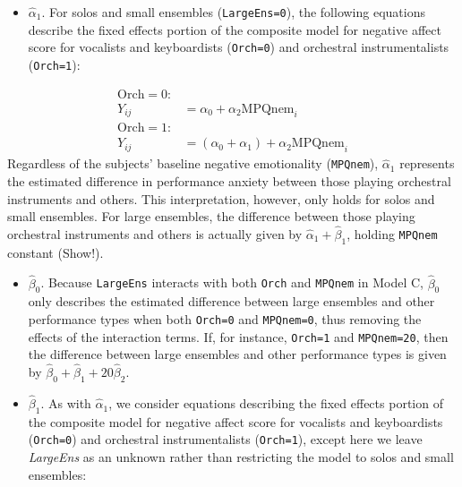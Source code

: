 \documentclass[
]{krantz}
\providecommand{\tightlist}{%
  \setlength{\itemsep}{0pt}\setlength{\parskip}{0pt}}
\begin{document}
\begin{itemize}
\tightlist
\item
  \(\hat{\alpha}_{1}\). For solos and small ensembles (\texttt{LargeEns=0}), the following equations describe the fixed effects portion of the composite model for negative affect score for vocalists and keyboardists (\texttt{Orch=0}) and orchestral instrumentalists (\texttt{Orch=1}):
\end{itemize}

\begin{align*}
\textrm{Orch}=0: & \\
Y_{ij} & = \alpha_{0}+\alpha_{2}\textrm{MPQnem}_{i} \\
\textrm{Orch}=1: & \\
Y_{ij} & = (\alpha_{0}+\alpha_{1})+\alpha_{2}\textrm{MPQnem}_{i}
\end{align*}
Regardless of the subjects' baseline negative emotionality (\texttt{MPQnem}), \(\hat{\alpha}_{1}\) represents the estimated difference in performance anxiety between those playing orchestral instruments and others. This interpretation, however, only holds for solos and small ensembles. For large ensembles, the difference between those playing orchestral instruments and others is actually given by \(\hat{\alpha}_{1}+\hat{\beta}_{1}\), holding \texttt{MPQnem} constant (Show!).

\begin{itemize}
\tightlist
\item
  \(\hat{\beta}_{0}\). Because \texttt{LargeEns} interacts with both \texttt{Orch} and \texttt{MPQnem} in Model C, \(\hat{\beta}_{0}\) only describes the estimated difference between large ensembles and other performance types when both \texttt{Orch=0} and \texttt{MPQnem=0}, thus removing the effects of the interaction terms. If, for instance, \texttt{Orch=1} and \texttt{MPQnem=20}, then the difference between large ensembles and other performance types is given by \(\hat{\beta}_{0}+\hat{\beta}_{1}+20\hat{\beta}_{2}\).
\item
  \(\hat{\beta}_{1}\). As with \(\hat{\alpha}_{1}\), we consider equations describing the fixed effects portion of the composite model for negative affect score for vocalists and keyboardists (\texttt{Orch=0}) and orchestral instrumentalists (\texttt{Orch=1}), except here we leave \emph{LargeEns} as an unknown rather than restricting the model to solos and small ensembles:
\end{itemize}
\end{document}
